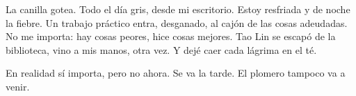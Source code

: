 
La canilla gotea. Todo el día gris, desde mi escritorio. Estoy resfriada
y de noche la fiebre. Un trabajo práctico entra, desganado, al cajón
de las cosas adeudadas. No me importa: hay cosas peores, hice cosas
mejores. Tao Lin se escapó de la biblioteca, vino a mis manos, otra vez.
Y dejé caer cada lágrima en el té.

En realidad sí importa, pero no ahora. Se va la tarde. El plomero tampoco
va a venir.

